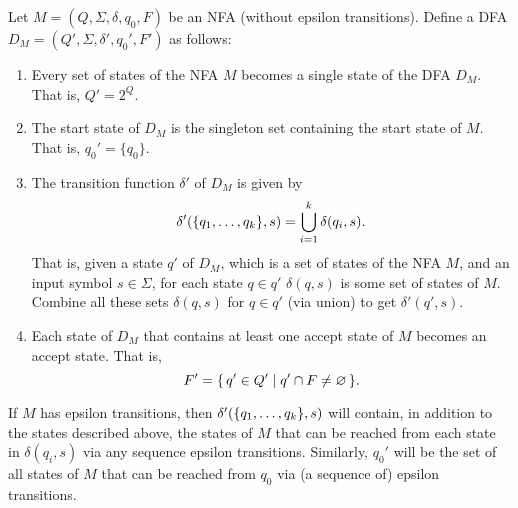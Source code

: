 Let $M = (Q, \Sigma, \delta, q_0, F)$ be an NFA (without epsilon transitions). Define a DFA $D_M = (Q', \Sigma, \delta', q_0', F')$ as follows:
\begin{enumerate}
\item Every set of states of the NFA $M$ becomes a single state of the DFA $D_M$. That is, $Q' = 2^Q$.
\item The start state of $D_M$ is the singleton set containing the start state of $M$. That is, $q_0' = \{q_0\}$.
\item The transition function $\delta'$ of $D_M$ is given by
\begin{equation*}
\delta'\pqty{ \{q_1, \ldots, q_k\}, s } = \bigcup_{i=1}^k \delta(q_i, s).
\end{equation*}
That is, given a state $q'$ of $D_M$, which is a set of states of the NFA $M$, and an input symbol $s \in \Sigma$, for each state $q \in q'$ $\delta(q, s)$ is some set of states of $M$. Combine all these sets $\delta(q, s)$ for $q \in q'$ (via union) to get $\delta'(q', s)$.
\item Each state of $D_M$ that contains at least one accept state of $M$ becomes an accept state. That is,
\begin{equation*}
F' = \qty{\, q' \in Q' \mid q' \cap F \ne \varnothing \,}.
\end{equation*}
\end{enumerate}

If $M$ has epsilon transitions, then $\delta'\pqty{ \{q_1, \ldots, q_k\}, s }$ will contain, in addition to the states described above, the states of $M$ that can be reached from each state in $\delta(q_i, s)$ via any sequence epsilon transitions. Similarly, $q_0'$ will be the set of all states of $M$ that can be reached from $q_0$ via (a sequence of) epsilon transitions.

